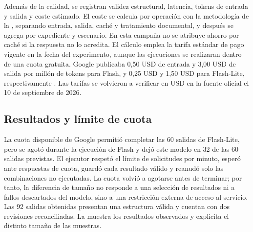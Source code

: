 Además de la calidad, se registran validez estructural, latencia, tokens de
entrada y salida y coste estimado. El coste se calcula por operación con la
metodología de la , separando entrada, salida, caché
y tratamiento documental, y después se agrega por expediente y escenario. En
esta campaña no se atribuye ahorro por caché si la respuesta no lo acredita.
El cálculo emplea la tarifa estándar
de pago vigente en la fecha del experimento, aunque las ejecuciones se
realizaran dentro de una cuota gratuita. Google publicaba 0,50 USD de entrada
y 3,00 USD de salida por millón de tokens para Flash, y 0,25 USD y 1,50 USD
para Flash-Lite, respectivamente \cite{googleGeminiPricing2026}. Las tarifas se
volvieron a verificar en USD en la fuente oficial el 10 de septiembre de 2026.

\subsection{Resultados y límite de cuota}

La cuota disponible de Google permitió completar las 60 salidas de Flash-Lite,
pero se agotó durante la ejecución de Flash y dejó este modelo en 32 de las 60
salidas previstas. El ejecutor respetó el límite de solicitudes por minuto,
esperó ante respuestas de cuota, guardó cada resultado válido y reanudó solo
las combinaciones no ejecutadas. La cuota volvió a agotarse antes de terminar;
por tanto, la diferencia de tamaño no responde a una selección de resultados
ni a fallos descartados del modelo, sino a una restricción externa de acceso al
servicio. Las 92 salidas obtenidas presentan una estructura válida y cuentan
con dos revisiones reconciliadas. La
 muestra los resultados observados y explicita
el distinto tamaño de las muestras.

\begin{table}[H]
  \centering
  \scriptsize
  \caption{Resultados de la evaluación de modelos generativos.}
  \label{tab:ai-evaluation-results}
\end{table}


